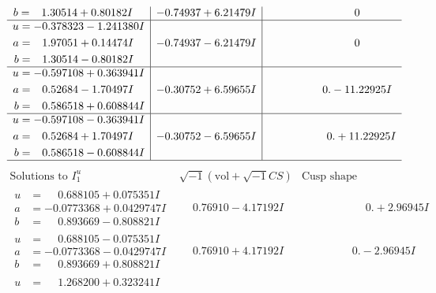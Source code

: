 \documentclass[1p]{elsarticle_modified}
\theoremstyle{definition}
\newcommand{\I}{\sqrt{-1}}
\begin{document}
$$\begin{array}{c|c|c}
\begin{aligned}
b &= \phantom{-}1.30514 + 0.80182 I\end{aligned}
 & -0.74937 + 6.21479 I & \phantom{-0.000000 } 0 \\ \hline\begin{aligned}
u &= -0.378323 - 1.241380 I \\
a &= \phantom{-}1.97051 + 0.14474 I \\
b &= \phantom{-}1.30514 - 0.80182 I\end{aligned}
 & -0.74937 - 6.21479 I & \phantom{-0.000000 } 0 \\ \hline\begin{aligned}
u &= -0.597108 + 0.363941 I \\
a &= \phantom{-}0.52684 - 1.70497 I \\
b &= \phantom{-}0.586518 + 0.608844 I\end{aligned}
 & -0.30752 + 6.59655 I & \phantom{-0.000000 } 0. - 11.22925 I \\ \hline\begin{aligned}
u &= -0.597108 - 0.363941 I \\
a &= \phantom{-}0.52684 + 1.70497 I \\
b &= \phantom{-}0.586518 - 0.608844 I\end{aligned}
 & -0.30752 - 6.59655 I & \phantom{-0.000000 -}0. + 11.22925 I\\
 \hline 
 \end{array}$$\newpage$$\begin{array}{c|c|c}  
\text{Solutions to }I^u_{1}& \I (\text{vol} + \sqrt{-1}CS) & \text{Cusp shape}\\
 \hline 
\begin{aligned}
u &= \phantom{-}0.688105 + 0.075351 I \\
a &= -0.0773368 + 0.0429747 I \\
b &= \phantom{-}0.893669 - 0.808821 I\end{aligned}
 & \phantom{-}0.76910 - 4.17192 I & \phantom{-0.000000 -}0. + 2.96945 I \\ \hline\begin{aligned}
u &= \phantom{-}0.688105 - 0.075351 I \\
a &= -0.0773368 - 0.0429747 I \\
b &= \phantom{-}0.893669 + 0.808821 I\end{aligned}
 & \phantom{-}0.76910 + 4.17192 I & \phantom{-0.000000 } 0. - 2.96945 I \\ \hline\begin{aligned}
u &= \phantom{-}1.268200 + 0.323241 I \\

\end{aligned}
\end{array}$$
\end{document}
